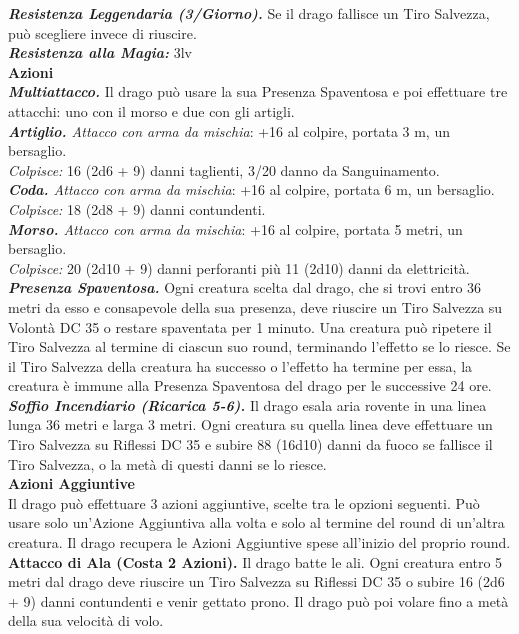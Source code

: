 \begin{multicols}{2}
{\emph{\textbf{Resistenza Leggendaria (3/Giorno).}} Se il drago fallisce un Tiro Salvezza, può scegliere invece di riuscire. \\
\emph{\textbf{Resistenza alla Magia:}} 3lv\\
\smallskip\textbf{Azioni}\\
\emph{\textbf{Multiattacco.}} Il drago può usare la sua Presenza Spaventosa e poi effettuare tre attacchi: uno con il morso e due con gli artigli.\\
\emph{\textbf{Artiglio.} Attacco con arma da mischia}: +16 al colpire, portata 3 m, un bersaglio.\\
\emph{Colpisce:} 16 (2d6 + 9) danni taglienti, 3/20 danno da Sanguinamento.\\
\emph{\textbf{Coda.} Attacco con arma da mischia}: +16 al colpire, portata 6 m, un bersaglio.\\
\emph{Colpisce:} 18 (2d8 + 9) danni contundenti.\\
\emph{\textbf{Morso.} Attacco con arma da mischia}: +16 al colpire, portata 5 metri, un bersaglio.\\
\emph{Colpisce:} 20 (2d10 + 9) danni perforanti più 11 (2d10) danni da elettricità.\\
\emph{\textbf{Presenza Spaventosa.}} Ogni creatura scelta dal drago, che si trovi entro 36 metri da esso e consapevole della sua presenza, deve riuscire un Tiro Salvezza su Volontà DC 35 o restare spaventata per 1 minuto. Una creatura può ripetere il Tiro Salvezza al termine di ciascun suo round, terminando l'effetto se lo riesce. Se il Tiro Salvezza della creatura ha successo o l'effetto ha termine per essa, la creatura è immune alla Presenza Spaventosa del drago per le successive 24 ore.\\
\emph{\textbf{Soffio Incendiario (Ricarica 5-6).}} Il drago esala aria rovente in una linea lunga 36 metri e larga 3 metri. Ogni creatura su quella linea deve effettuare un Tiro Salvezza su Riflessi DC 35 e subire 88 (16d10) danni da fuoco se fallisce il Tiro Salvezza, o la metà di questi danni se lo riesce.\\
\textbf{Azioni Aggiuntive}\\
Il drago può effettuare 3 azioni aggiuntive, scelte tra le opzioni seguenti. Può usare solo un'Azione Aggiuntiva alla volta e solo al termine del round di un'altra creatura. Il drago recupera le Azioni Aggiuntive spese all'inizio del proprio round.\\
\textbf{Attacco di Ala (Costa 2 Azioni).} Il drago batte le ali. Ogni creatura entro 5 metri dal drago deve riuscire un Tiro Salvezza su Riflessi DC 35 o subire 16 (2d6 + 9) danni contundenti e venir gettato prono. Il drago può poi volare fino a metà della sua velocità di volo.\\
}
\end{multicols}
